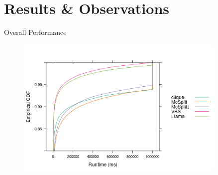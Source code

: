 \documentclass{beamer}
\begin{document}

\section{Results \& Observations}

\begin{frame}{Overall Performance}
  \begin{figure}
    \centering
    \includegraphics[width=0.9\textwidth]{ecdf_both_labels_llama.png}
  \end{figure}
\end{frame}
\end{document}

